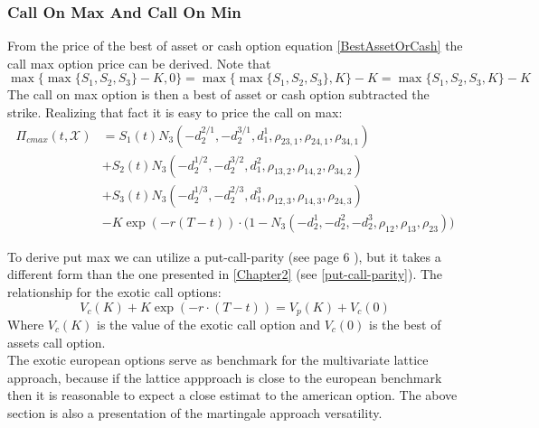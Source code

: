 \subsubsection{Call On Max And Call On Min}
From the price of the best of asset or cash option equation \eqref{BestAssetOrCash} the call max option price can be derived. Note that
$$\max\{\max\{ S_1,S_2,S_3 \} - K, 0\}=\max\{\max\{ S_1,S_2,S_3 \}, K\} - K = \max\{ S_1,S_2,S_3,K \} - K$$
The call on max option is then a best of asset or cash option subtracted the strike. Realizing that fact it is easy to price the call on max:
\begin{equation}\label{callMax}
\begin{split}
\Pi_{cmax}(t,\mathcal{X})&=S_1(t) N_3(-d_2^{2/1},-d_2^{3/1},d_1^{1}, \rho_{23,1}, \rho_{24,1}, \rho_{34,1}) \\
&+S_2(t) N_3(-d_2^{1/2},-d_2^{3/2},d_1^{2}, \rho_{13,2}, \rho_{14,2}, \rho_{34,2})\\
&+S_3(t) N_3(-d_2^{1/3},-d_2^{2/3},d_1^{3}, \rho_{12,3}, \rho_{14,3}, \rho_{24,3}) \\
&-K \exp(-r(T-t)) \cdot\bigg(1 - N_3(-d_2^1,-d_2^2,-d_2^3, \rho_{12}, \rho_{13}, \rho_{23})\bigg)
\end{split}
\end{equation}

To derive put max we can utilize a put-call-parity (see page 6 \parencite{Ouwehand2006}), but it takes a different form than the one presented in \ref{Chapter2} (see \ref{put-call-parity}). The relationship for the exotic call options:
$$V_c(K)+K\exp(-r\cdot (T-t)) = V_p(K)+V_c(0)$$
Where $V_c(K)$ is the value of the exotic call option and $V_c(0)$ is the best of assets call option.\\

The exotic european options serve as benchmark for the multivariate lattice approach, because if the lattice appproach is close to the european benchmark then it is reasonable to expect a close estimat to the american option. The above section is also a presentation of the martingale approach versatility. 



